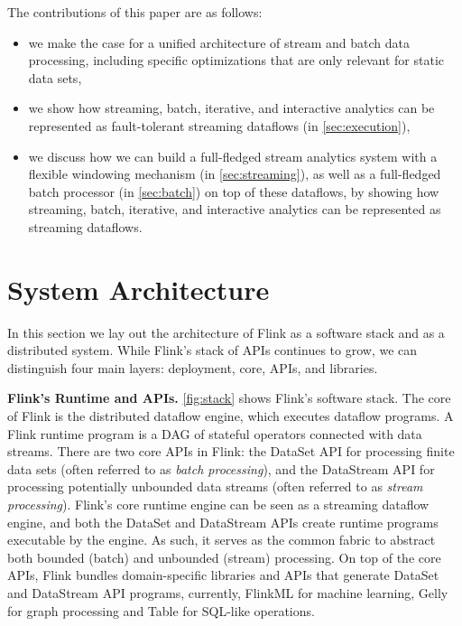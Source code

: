\documentclass[11pt]{article}
\newcommand{\para}[1]{\vspace{2mm}\noindent\textbf{#1}}
\begin{document}
\vspace{2mm}
\noindent The contributions of this paper are as follows:\vspace{-2mm}
\begin{itemize}
	\item we make the case for a unified architecture of stream and batch data processing, including specific optimizations that are only relevant for static data sets,
	\vspace{-3mm}
	\item we show how streaming, batch, iterative, and interactive analytics can be represented as fault-tolerant streaming dataflows (in \autoref{sec:execution}),
	\vspace{-3mm}
	\item we discuss how we can build a full-fledged stream analytics system with a flexible windowing mechanism (in \autoref{sec:streaming}), as well as a full-fledged batch processor (in \autoref{sec:batch}) on top of these dataflows, by showing how streaming, batch, iterative, and interactive analytics can be represented as streaming dataflows.
\end{itemize}





\section{System Architecture}
\label{sec:architecture}
\vspace{-2mm}
In this section we lay out the architecture of Flink as a software stack and as a distributed system. While Flink's stack of APIs continues to grow, we can distinguish four main layers: deployment, core, APIs, and libraries.

\para{Flink's Runtime and APIs.}  \autoref{fig:stack} shows Flink's software stack. The core of Flink is the distributed dataflow engine, which executes dataflow programs. A Flink runtime program is a DAG of stateful operators connected with data streams. There are two core APIs in Flink: the DataSet API for processing finite data sets (often referred to as \emph{batch processing}), and the DataStream API for processing potentially unbounded data streams (often referred to as \emph{stream processing}). Flink's core runtime engine can be seen as a streaming dataflow engine, and both the DataSet and DataStream APIs create runtime programs executable by the engine. As such, it serves as the common fabric to abstract both bounded (batch) and unbounded (stream) processing. On top of the core APIs, Flink bundles domain-specific libraries and APIs that generate DataSet and DataStream API programs, currently, FlinkML for machine learning, Gelly  for graph processing and Table for SQL-like operations. 
\end{document}
